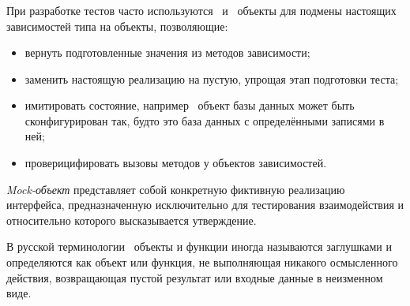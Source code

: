 \subsubsection{}
\label{sec:testing:unit:mock}

При разработке тестов часто используются \mock \, и \stub \, объекты для подмены настоящих зависимостей типа на объекты, позволяющие:

\begin{itemize}
	\item вернуть подготовленные значения из методов зависимости;
	\item заменить настоящую реализацию на пустую, упрощая этап подготовки теста;
	\item имитировать состояние, например \stub \, объект базы данных может быть сконфигурирован так, будто это база данных с определёнными записями в ней;
	\item проверицифировать вызовы методов у объектов зависимостей.
\end{itemize}

\textit{Mock-объект} представляет собой конкретную фиктивную реализацию интерфейса, предназначенную исключительно для тестирования взаимодействия и относительно которого высказывается утверждение\cite{wiki:mock}.

В русской терминологии \stub \, объекты и функции иногда называются заглушками и определяются как объект или функция, не выполняющая никакого осмысленного действия, возвращающая пустой результат или входные данные в неизменном виде\cite{wiki:stub}.
